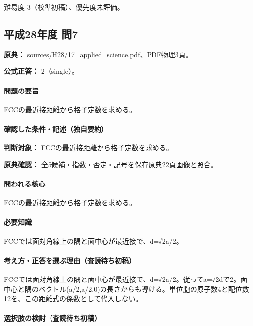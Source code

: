 \par 難易度 3（校準初稿）、優先度未評価。

\subsection{平成28年度 問7}
\label{q:h28-reg-applied-07}

\noindent\textbf{原典：} sources/H28/17\_applied\_science.pdf、PDF物理3頁。

\textbf{公式正答：} 2（single）。

\paragraph{問題の要旨} FCCの最近接距離から格子定数を求める。

\paragraph{確認した条件・記述（独自要約）}\mbox{}\par

\noindent\textbf{判断対象：} FCCの最近接距離から格子定数を求める。\par

\noindent\textbf{原典確認：} 全5候補・指数・否定・記号を保存原典22頁画像と照合。\par

\paragraph{問われる核心} FCCの最近接距離から格子定数を求める。

\paragraph{必要知識} FCCでは面対角線上の隅と面中心が最近接で、d=√2a/2。

\paragraph{考え方・正答を選ぶ理由（査読待ち初稿）} FCCでは面対角線上の隅と面中心が最近接で、d=√2a/2。従ってa=√2dで2。面中心と隅のベクトル(a/2,a/2,0)の長さからも導ける。単位胞の原子数4と配位数12を、この距離式の係数として代入しない。

\paragraph{選択肢の検討（査読待ち初稿）}\mbox{}\par

